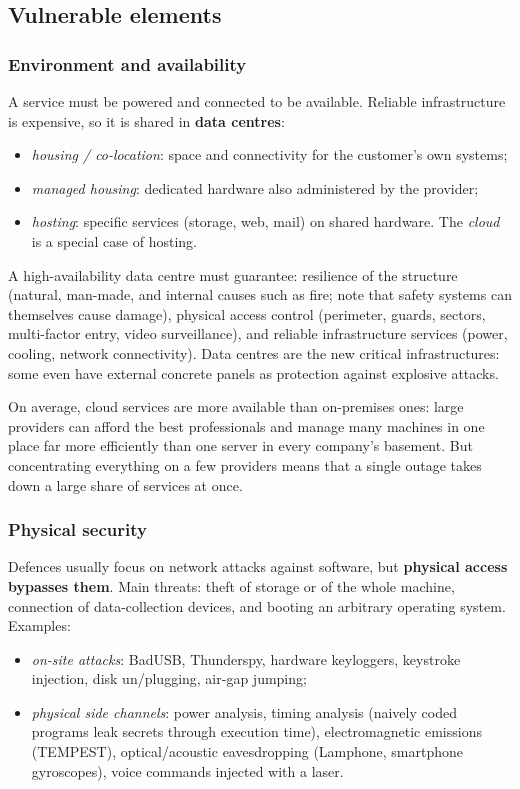 \subsection{Vulnerable elements}

\subsubsection{Environment and availability}
A service must be powered and connected to be available. Reliable infrastructure is expensive, so it is shared in \textbf{data centres}:
\begin{itemize}
    \item \emph{housing / co-location}: space and connectivity for the customer's own systems;
    \item \emph{managed housing}: dedicated hardware also administered by the provider;
    \item \emph{hosting}: specific services (storage, web, mail) on shared hardware. The \emph{cloud} is a special case of hosting.
\end{itemize}
A high-availability data centre must guarantee: resilience of the structure (natural, man-made, and internal causes such as fire; note that safety systems can themselves cause damage), physical access control (perimeter, guards, sectors, multi-factor entry, video surveillance), and reliable infrastructure services (power, cooling, network connectivity). Data centres are the new critical infrastructures: some even have external concrete panels as protection against explosive attacks.

\begin{remark}
On average, cloud services are more available than on-premises ones: large providers can afford the best professionals and manage many machines in one place far more efficiently than one server in every company's basement. But concentrating everything on a few providers means that a single outage takes down a large share of services at once.
\end{remark}

\subsubsection{Physical security}
Defences usually focus on network attacks against software, but \textbf{physical access bypasses them}. Main threats: theft of storage or of the whole machine, connection of data-collection devices, and booting an arbitrary operating system. Examples:
\begin{itemize}
    \item \emph{on-site attacks}: BadUSB, Thunderspy, hardware keyloggers, keystroke injection, disk un/plugging, air-gap jumping;
    \item \emph{physical side channels}: power analysis, timing analysis (naively coded programs leak secrets through execution time), electromagnetic emissions (TEMPEST), optical/acoustic eavesdropping (Lamphone, smartphone gyroscopes), voice commands injected with a laser.
\end{itemize}

